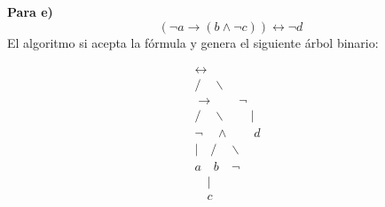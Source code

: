 \textbf{Para e)}
\[
(\neg a \rightarrow (b \land \neg c)) \leftrightarrow \neg d
\]  \newline
El algoritmo si acepta la fórmula y genera el siguiente árbol binario: \newline

\begin{center}
\[
\begin{array}{c}
\leftrightarrow \\
/ \quad \backslash \\
\rightarrow \quad \quad \neg \\
/ \quad \backslash \quad \quad | \\
\neg \quad \land \quad \quad d \\
| \quad / \quad \backslash \quad \quad  \\
a \quad b \quad \neg \quad \quad \\
\quad | \\
\quad c \\
\end{array}
\]
\end{center}